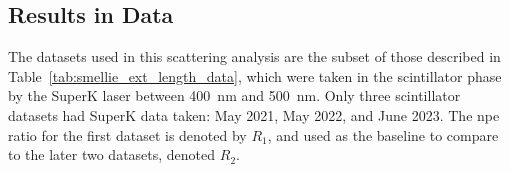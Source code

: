 
\subsection{Results in Data}
The datasets used in this scattering analysis are the subset of those described in Table~\ref{tab:smellie_ext_length_data}, which were taken in the scintillator phase by the SuperK laser between \SI{400}{\nm} and \SI{500}{\nm}. Only three scintillator datasets had SuperK data taken: May 2021, May 2022, and June 2023. The npe ratio for the first dataset is denoted by $R_{1}$, and used as the baseline to compare to the later two datasets, denoted $R_{2}$.

